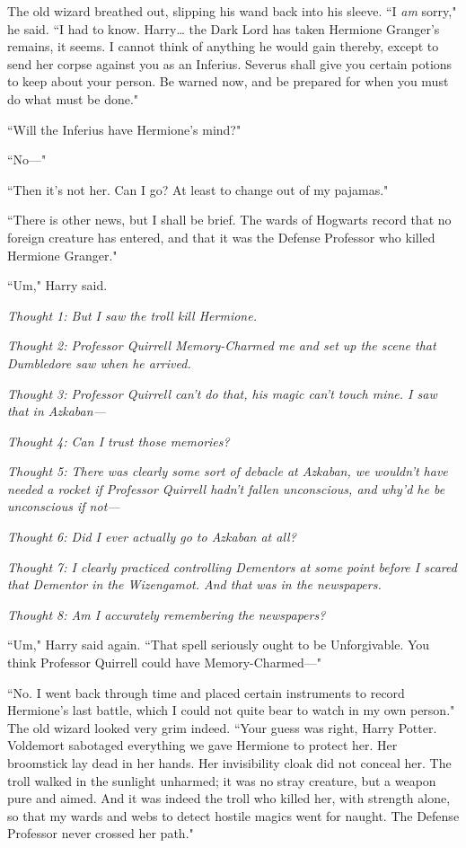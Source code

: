 The old wizard breathed out, slipping his wand back into his sleeve. ``I \emph{am} sorry," he said. ``I had to know. Harry{\ldots} the Dark Lord has taken Hermione Granger's remains, it seems. I cannot think of anything he would gain thereby, except to send her corpse against you as an Inferius. Severus shall give you certain potions to keep about your person. Be warned now, and be prepared for when you must do what must be done."

``Will the Inferius have Hermione's mind?"

``No—"

``Then it's not her. Can I go? At least to change out of my pajamas."

``There is other news, but I shall be brief. The wards of Hogwarts record that no foreign creature has entered, and that it was the Defense Professor who killed Hermione Granger."

``Um," Harry said.

\emph{Thought 1: But I saw the troll kill Hermione.}

\emph{Thought 2: Professor Quirrell Memory-Charmed me and set up the scene that Dumbledore saw when he arrived.}

\emph{Thought 3: Professor Quirrell can't do that, his magic can't touch mine. I saw that in Azkaban—}

\emph{Thought 4: Can I trust those memories?}

\emph{Thought 5: There was clearly some sort of debacle at Azkaban, we wouldn't have needed a rocket if Professor Quirrell hadn't fallen unconscious, and why'd he be unconscious if not—}

\emph{Thought 6: Did I ever actually go to Azkaban at all?}

\emph{Thought 7: I clearly practiced controlling Dementors at some point before I scared that Dementor in the Wizengamot. And \emph{that} was in the newspapers.}

\emph{Thought 8: Am I accurately remembering the newspapers?}

``Um," Harry said again. ``That spell seriously ought to be Unforgivable. You think Professor Quirrell could have Memory-Charmed—"

``No. I went back through time and placed certain instruments to record Hermione's last battle, which I could not quite bear to watch in my own person." The old wizard looked very grim indeed. ``Your guess was right, Harry Potter. Voldemort sabotaged everything we gave Hermione to protect her. Her broomstick lay dead in her hands. Her invisibility cloak did not conceal her. The troll walked in the sunlight unharmed; it was no stray creature, but a weapon pure and aimed. And it was indeed the troll who killed her, with strength alone, so that my wards and webs to detect hostile magics went for naught. The Defense Professor never crossed her path."

